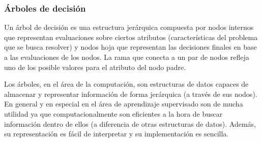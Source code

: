 \subsubsection{Árboles de decisión}
\label{subsection:arboles_decision}




	Un árbol de decisión es una estructura jerárquica compuesta por nodos internos que representan evaluaciones sobre ciertos atributos (características del problema que se busca resolver) y nodos hoja que representan las decisiones finales en base a las evaluaciones de los nodos. La rama que conecta a un par de nodos refleja uno de los posible valores para el atributo del nodo padre.
	
	Los árboles, en el área de la computación, son estructuras de datos capaces de almacenar y representar información de forma jerárquica (a través de sus nodos). En general y en especial en el área de aprendizaje supervisado son de mucha utilidad ya que computacionalmente son eficientes a la hora de buscar información dentro de ellos (a diferencia de otras estructuras de datos). Además, su representación es fácil de interpretar y su implementación es sencilla.

